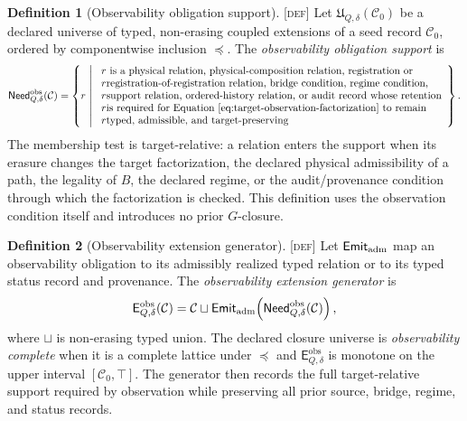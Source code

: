\documentclass[11pt]{article}
\newcommand{\ObsNeed}{\ensuremath{\mathsf{Need}^{\mathrm{obs}}}}
\newcommand{\Defn}{\textsc{[def]}}
\theoremstyle{definition}
\newtheorem{sdefinition}{Definition}
\begin{document}
\begin{sdefinition}[Observability obligation support]
\label{def:observability-obligation-support}
\Defn{} Let $\mathfrak U_{Q,\delta}(\mathcal C_0)$ be a declared universe of
typed, non-erasing coupled extensions of a seed record $\mathcal C_0$, ordered by
componentwise inclusion $\preceq$. The \emph{observability obligation support} is
\begin{equation}
\ObsNeed_{Q,\delta}(\mathcal C)=
\left\{r\ \middle|\ 
\begin{array}{l}
r\text{ is a physical relation, physical-composition relation, registration or}\\
r\text{registration-of-registration relation, bridge condition, regime condition,}\\
r\text{support relation, ordered-history relation, or audit record whose retention}\\
r\text{is required for Equation~\eqref{eq:target-observation-factorization} to remain}\\
r\text{typed, admissible, and target-preserving}
\end{array}
\right\}.
\label{eq:observability-obligation-support}
\end{equation}
The membership test is target-relative: a relation enters the support when its
erasure changes the target factorization, the declared physical admissibility of a
path, the legality of $B$, the declared regime, or the audit/provenance condition
through which the factorization is checked. This definition uses the observation
condition itself and introduces no prior $G$-closure.
\end{sdefinition}

\begin{sdefinition}[Observability extension generator]
\label{def:observability-extension-generator}
\Defn{} Let $\mathsf{Emit}_{\rm adm}$ map an observability obligation to its
admissibly realized typed relation or to its typed status record and provenance.
The \emph{observability extension generator} is
\begin{equation}
\mathsf E^{\mathrm{obs}}_{Q,\delta}(\mathcal C)=
\mathcal C\sqcup
\mathsf{Emit}_{\rm adm}\!\left(\ObsNeed_{Q,\delta}(\mathcal C)\right),
\label{eq:observability-extension-generator}
\end{equation}
where $\sqcup$ is non-erasing typed union. The declared closure universe is
\emph{observability complete} when it is a complete lattice under $\preceq$ and
$\mathsf E^{\mathrm{obs}}_{Q,\delta}$ is monotone on the upper interval
$[\mathcal C_0,\top]$. The generator then records the full target-relative support
required by observation while preserving all prior source, bridge, regime, and
status records.
\end{sdefinition}
\end{document}
